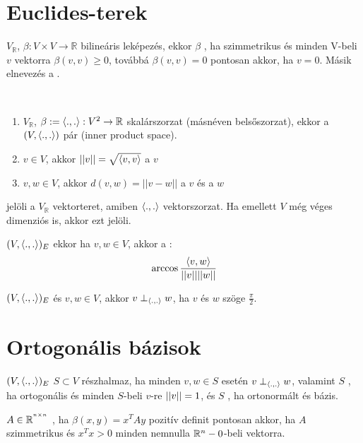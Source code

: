 \section{Euclides-terek}
\begin{ff}
	$V_{\mathbb{R}}$, $\beta:V\times V\to \mathbb{R}$ bilineáris leképezés,
	ekkor $\beta$ , ha szimmetrikus és minden V-beli
	$v$ vektorra $\beta(v,v)\ge 0$, továbbá $\beta(v,v)=0$ pontosan akkor,
	ha $v=0$. Másik elnevezés a .
\end{ff}

\begin{ff}
	~\begin{enumerate}
		\item $V_{\mathbb{R}}$, $\beta:=\langle.,.\rangle:V^2\to \mathbb{R}$
			skalárszorzat (másnéven belsőszorzat), ekkor a $(V,\langle.,.\rangle)$ pár
			 (inner product space).
		\item $v\in V$, akkor $||v||=\sqrt{\langle v,v\rangle}$ a $v$ 
		\item $v,w\in V$, akkor $d(v,w)=||v-w||$ a $v$ és a $w$ 
	\end{enumerate}
\end{ff}
\begin{jel}
	 jelöli a $V_\mathbb{R}$ vektorteret, amiben $\langle.,.\rangle$ 
	vektorszorzat. Ha emellett $V$ még véges dimenziós is, akkor ezt
	 jelöli.
\end{jel}
\begin{ff}
	$(V,\langle.,.\rangle)_E$ ekkor ha $v,w\in V$, akkor a :
	\begin{equation*}
		\arccos\frac{\langle v,w\rangle}{||v||||w||}
	\end{equation*}
\end{ff}
\begin{ff}
	$(V,\langle.,.\rangle)_E$ és $v,w\in V$, akkor $v\perp_{\langle.,.\rangle}w$, ha $v$ és $w$ szöge $\frac{\pi}{2}$.
\end{ff}

\section{Ortogonális bázisok}
\begin{ff}
	$(V,\langle.,.\rangle)_E$ $S\subset V$  részhalmaz, ha minden $v,w\in S$ 
	esetén $v\perp_{\langle.,.\rangle}w$, valamint $S$ , ha
	ortogonális és minden $S$-beli $v$-re $||v||=1$, és $S$
	, ha ortonormált és bázis.
\end{ff}
\begin{ff}
	$A\in\mathbb{R}^{^{n\times n}}$ , ha $\beta(x,y)=x^TAy$
	pozitív definit pontosan akkor, ha $A$ szimmetrikus és $x^Tx>0$ minden
	nemnulla $\mathbb{R}^n-{0}$-beli vektorra.
\end{ff}

